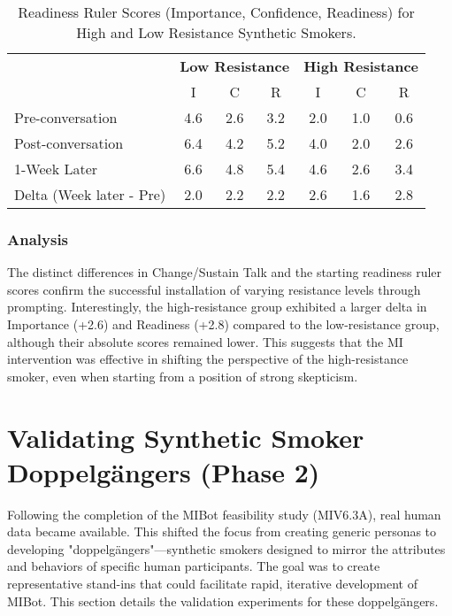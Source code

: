 \begin{table}[h]
\centering
\caption{Readiness Ruler Scores (Importance, Confidence, Readiness) for High and Low Resistance Synthetic Smokers.}
\label{tab:resistance_readiness_rulers}
\begin{tabular}{|l|ccc|ccc|}
\hline
 & \multicolumn{3}{c|}{\textbf{Low Resistance}} & \multicolumn{3}{c|}{\textbf{High Resistance}} \\
 & I & C & R & I & C & R \\ \hline
Pre-conversation & 4.6 & 2.6 & 3.2 & 2.0 & 1.0 & 0.6 \\
Post-conversation & 6.4 & 4.2 & 5.2 & 4.0 & 2.0 & 2.6 \\
1-Week Later & 6.6 & 4.8 & 5.4 & 4.6 & 2.6 & 3.4 \\ \hline
Delta (Week later - Pre) & 2.0 & 2.2 & 2.2 & 2.6 & 1.6 & 2.8 \\ \hline
\end{tabular}
\end{table}

\subsubsection{Analysis}

The distinct differences in Change/Sustain Talk and the starting readiness ruler scores confirm the successful installation of varying resistance levels through prompting. Interestingly, the high-resistance group exhibited a larger delta in Importance (+2.6) and Readiness (+2.8) compared to the low-resistance group, although their absolute scores remained lower. This suggests that the MI intervention was effective in shifting the perspective of the high-resistance smoker, even when starting from a position of strong skepticism.

\section{Validating Synthetic Smoker Doppelgängers (Phase 2)}

Following the completion of the MIBot feasibility study (MIV6.3A), real human data became available. This shifted the focus from creating generic personas to developing "doppelgängers"—synthetic smokers designed to mirror the attributes and behaviors of specific human participants. The goal was to create representative stand-ins that could facilitate rapid, iterative development of MIBot. This section details the validation experiments for these doppelgängers.

